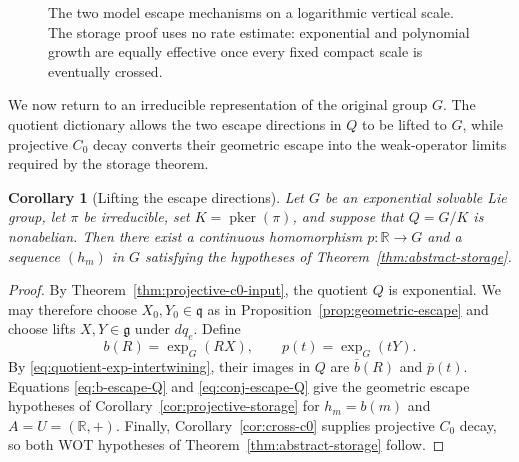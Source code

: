 \documentclass[10pt,a4paper]{amsart}
\numberwithin{equation}{section}
\newtheorem{corollary}[theorem]{Corollary}
\newcommand{\R}{\mathbb R}
\newcommand{\pker}{\operatorname{pker}}
\newcommand{\e}{\mathrm e}
\begin{document}
\begin{figure}[t]
\centering
{}
\caption{The two model escape mechanisms on a logarithmic vertical scale.
The storage proof uses no rate estimate: exponential and polynomial growth
are equally effective once every fixed compact scale is eventually crossed.}
\label{fig:escape-rates}
\end{figure}

We now return to an irreducible representation of the original group $G$.
The quotient dictionary allows the two escape directions in $Q$ to be lifted
to $G$, while projective $C_0$ decay converts their geometric escape into the
weak-operator limits required by the storage theorem.

\begin{corollary}[Lifting the escape directions]
\label{cor:lifted-escape}
Let $G$ be an exponential solvable Lie group, let $\pi$ be irreducible, set
$K=\pker(\pi)$, and suppose that $Q=G/K$ is nonabelian.  Then there exist
a continuous homomorphism $p:\R\to G$ and a sequence $(h_m)$ in $G$
satisfying the hypotheses of Theorem~\ref{thm:abstract-storage}.
\end{corollary}

\begin{proof}
By Theorem~\ref{thm:projective-c0-input}, the quotient $Q$ is exponential.
We may therefore choose
$X_0,Y_0\in\mathfrak q$ as in Proposition~\ref{prop:geometric-escape} and
choose lifts $X,Y\in\mathfrak g$ under $dq_e$.  Define
\[
 b(R)=\exp_G(RX),
 \qquad p(t)=\exp_G(tY).
\]
By \eqref{eq:quotient-exp-intertwining}, their images in $Q$ are
$\overline b(R)$ and $\overline p(t)$.  Equations
\eqref{eq:b-escape-Q} and \eqref{eq:conj-escape-Q} give the geometric escape
hypotheses of Corollary~\ref{cor:projective-storage} for $h_m=b(m)$ and
$A=U=(\R,+)$.  Finally, Corollary~\ref{cor:cross-c0} supplies projective
$C_0$ decay, so both WOT hypotheses of
Theorem~\ref{thm:abstract-storage} follow.
\end{proof}
\end{document}
